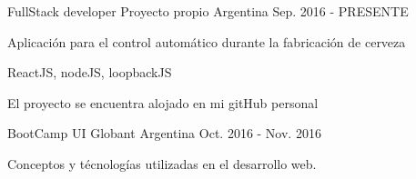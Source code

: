


\begin{cventries}

\cventry
{FullStack developer} %
{Proyecto propio} %
{Argentina} %
{Sep. 2016 - PRESENTE} %
{ %
\begin{cvitems}
\item {Aplicación para el control automático durante la fabricación de cerveza}
\item {ReactJS, nodeJS, loopbackJS}
\item {El proyecto se encuentra alojado en mi gitHub personal}
\end{cvitems}
}


\cventry
{BootCamp UI} %
{Globant} %
{Argentina} %
{Oct. 2016 - Nov. 2016} %
{ %
\begin{cvitems}
\item {Conceptos y técnologías utilizadas en el desarrollo web.}
\end{cvitems}
}


\end{cventries}

